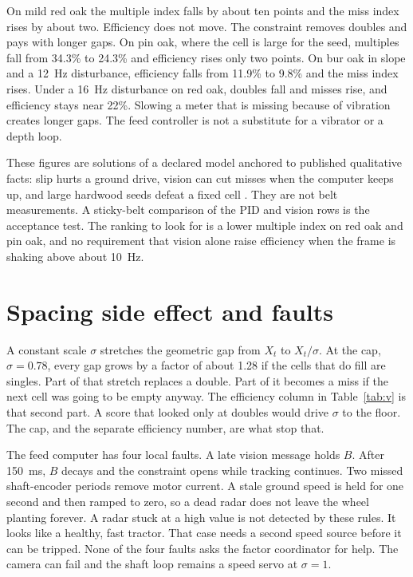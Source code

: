 \documentclass[11pt,a4paper]{article}
\begin{document}
On mild red oak the multiple index falls by about ten points and the miss index rises by about two. Efficiency does not move. The constraint removes doubles and pays with longer gaps. On pin oak, where the cell is large for the seed, multiples fall from 34.3\% to 24.3\% and efficiency rises only two points. On bur oak in slope and a 12~Hz disturbance, efficiency falls from 11.9\% to 9.8\% and the miss index rises. Under a 16~Hz disturbance on red oak, doubles fall and misses rise, and efficiency stays near 22\%. Slowing a meter that is missing because of vibration creates longer gaps. The feed controller is not a substitute for a vibrator or a depth loop.

These figures are solutions of a declared model anchored to published qualitative facts: slip hurts a ground drive, vision can cut misses when the computer keeps up, and large hardwood seeds defeat a fixed cell \cite{wells1990,zhao2024,borja2021}. They are not belt measurements. A sticky-belt comparison of the PID and vision rows is the acceptance test. The ranking to look for is a lower multiple index on red oak and pin oak, and no requirement that vision alone raise efficiency when the frame is shaking above about 10~Hz.

\section{Spacing side effect and faults}

A constant scale $\sigma$ stretches the geometric gap from $X_t$ to $X_t/\sigma$. At the cap, $\sigma=0.78$, every gap grows by a factor of about 1.28 if the cells that do fill are singles. Part of that stretch replaces a double. Part of it becomes a miss if the next cell was going to be empty anyway. The efficiency column in Table~\ref{tab:v} is that second part. A score that looked only at doubles would drive $\sigma$ to the floor. The cap, and the separate efficiency number, are what stop that.

The feed computer has four local faults. A late vision message holds $B$. After 150~ms, $B$ decays and the constraint opens while tracking continues. Two missed shaft-encoder periods remove motor current. A stale ground speed is held for one second and then ramped to zero, so a dead radar does not leave the wheel planting forever. A radar stuck at a high value is not detected by these rules. It looks like a healthy, fast tractor. That case needs a second speed source before it can be tripped. None of the four faults asks the factor coordinator for help. The camera can fail and the shaft loop remains a speed servo at $\sigma=1$.
\end{document}
